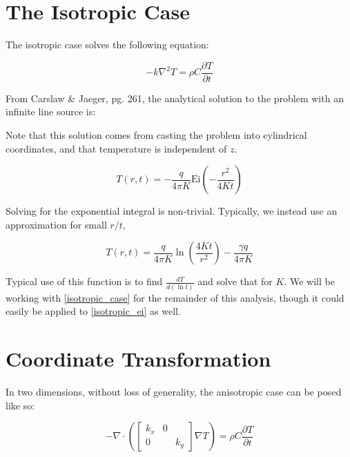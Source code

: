 \documentclass[10pt, letterpaper]{article}
\begin{document}
\newcommand{\Ei}{\textrm{Ei}}
\newcommand{\e}[0]{\hat{e}} %
\newcommand{\norm}[1]{\left|\left|{#1}\right|\right|}

\section{The Isotropic Case}

The isotropic case solves the following equation:

\begin{equation*}
-k\nabla^2 T = \rho C\frac{\partial T}{\partial t}
\end{equation*}

From Carslaw \& Jaeger, pg. 261, the analytical solution to the problem with an infinite line source is:

Note that this solution comes from casting the problem into cylindrical coordinates, and that temperature is independent of \(z\).

\begin{equation}
\label{isotropic_ei}
T(r,t) = - \frac{q}{4\pi K}\Ei\left(-\frac{r^2}{4Kt}\right)
\end{equation}

Solving for the exponential integral is non-trivial.  Typically, we instead use an approximation for small \(r/t\),

\begin{equation}
\label{isotropic_case}
T(r,t) = \frac{q}{4\pi K}\ln\left(\frac{4Kt}{r^2}\right) - \frac{\gamma q}{4\pi K}
\end{equation}

Typical use of this function is to find \(\frac{dT}{d(\ln t)}\) and solve that for \(K\). We will be working with \ref{isotropic_case} for the remainder of this analysis, though it could easily be applied to \ref{isotropic_ei} as well.

\section{Coordinate Transformation}

In two dimensions, without loss of generality, the anisotropic case can be posed like so:

\begin{equation}
-\nabla \cdot \left(\begin{bmatrix}k_x & 0\\ 0 && k_y\end{bmatrix}\nabla T \right)= \rho C\frac{\partial T}{\partial t}
\end{equation}
\end{document}
